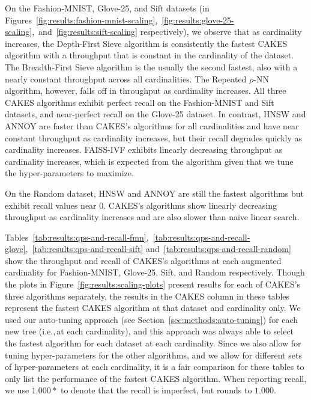 On the Fashion-MNIST, Glove-25, and Sift datasets (in Figures~\ref{fig:results:fashion-mnist-scaling},~\ref{fig:results:glove-25-scaling},~and~\ref{fig:results:sift-scaling} respectively), we observe that as cardinality increases, the Depth-First Sieve algorithm is consistently the fastest CAKES algorithm with a throughput that is constant in the cardinality of the dataset.
The Breadth-First Sieve algorithm is the usually the second fastest, also with a nearly constant throughput across all cardinalities.
The Repeated $\rho$-NN algorithm, however, falls off in throughput as cardinality increases.
All three CAKES algorithms exhibit perfect recall on the Fashion-MNIST and Sift datasets, and near-perfect recall on the Glove-25 dataset.
In contrast, HNSW and ANNOY are faster than CAKES's algorithms for all cardinalities and have near constant throughput as cardinality increases, but their recall degrades quickly as cardinality increases.
FAISS-IVF exhibits linearly decreasing throughput as cardinality increases, which is expected from the algorithm given that we tune the hyper-parameters to maximize.

On the Random dataset, HNSW and ANNOY are still the fastest algorithms but exhibit recall values near 0.
CAKES's algorithms show linearly decreasing throughput as cardinality increases and are also slower than na\"{i}ve linear search.

Tables~\ref{tab:results:qps-and-recall-fmn},~\ref{tab:results:qps-and-recall-glove},~\ref{tab:results:qps-and-recall-sift} and~\ref{tab:results:qps-and-recall-random} show the throughput and recall of CAKES's algorithms at each augmented cardinality for Fashion-MNIST, Glove-25, Sift, and Random respectively.
Though the plots in Figure~\ref{fig:results:scaling-plots} present results for each of CAKES's three algorithms separately, the results in the CAKES column in these tables represent the fastest CAKES algorithm at that dataset and cardinality only.
We used our auto-tuning approach (see Section~\ref{sec:methods:auto-tuning}) for each new tree (i.e.,\,at each cardinality), and this approach was always able to select the fastest algorithm for each dataset at each cardinality.
Since we also allow for tuning hyper-parameters for the other algorithms, and we allow for different sets of hyper-parameters at each cardinality, it is a fair comparison for these tables to only list the performance of the fastest CAKES algorithm.
When reporting recall, we use $1.000*$ to denote that the recall is imperfect, but rounds to $1.000$.

